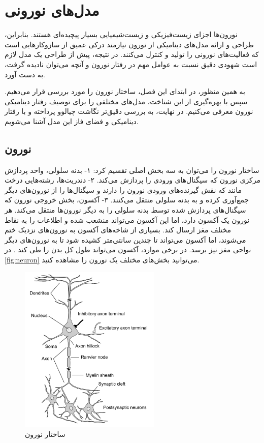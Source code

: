 \chapter{مدل‌های نورونی} \label{chap:neuron}

نورون‌ها اجزای زیست‌فیزیکی و زیست‌شیمیایی بسیار پیچیده‌ای هستند.
بنابراین، طراحی و ارائه مدل‌های دینامیکی از نورون نیازمند درکی عمیق از سازوکارهایی است که فعالیت‌های نورونی را تولید و کنترل می‌کنند.
در نتیجه، پیش از طراحی یک مدل لازم است شهودی دقیق نسبت به عوامل مهم در رفتار نورون و آنچه می‌توان نادیده گرفت، به دست آورد.

به همین منظور، در ابتدای این فصل، ساختار نورون را مورد بررسی قرار می‌دهیم.
سپس با بهره‌گیری از این شناخت، مدل‌های مختلفی را برای توصیف رفتار دینامیکی نورون معرفی می‌کنیم.
در نهایت، به بررسی دقیق‌تر نگاشت چیالوو پرداخته و با رفتار دینامیکی و فضای فاز این مدل آشنا می‌شویم.

\section{نورون}
ساختار نورون را می‌توان به سه بخش اصلی تقسیم کرد:
۱- بدنه سلولی، واحد پردازش مرکزی نورون که سیگنال‌های ورودی را پردازش می‌کند.
۲- دندریت‌ها، رشته‌هایی درخت مانند که نقش گیرنده‌های ورودی نورون را دارند و سیگنال‌ها را از نورون‌های دیگر جمع‌آوری کرده و به بدنه سلولی منتقل می‌کنند.
۳- آکسون، بخش خروجی نورون که سیگنال‌های پردازش شده توسط بدنه سلولی را به دیگر نورون‌ها منتقل می‌کند.
هر نورون یک آکسون دارد، اما این آکسون می‌تواند منشعب شده و اطلاعات را به نقاط مختلف مغز ارسال کند.
بسیاری از شاخه‌های آکسون به نورون‌های نزدیک ختم می‌شوند، اما آکسون می‌تواند تا چندین سانتی‌متر کشیده شود تا به نورون‌های دیگر نواحی مغز نیز برسد.
در برخی موارد، آکسون می‌تواند طول کل بدن را طی کند
\cite{dayan2001,gerstner2002,rabinovich2006,trappenberg2022}.
در
\autoref{fig:neuron}
می‌توانید بخش‌های مختلف یک نورون را مشاهده کنید.

\begin{figure}[!ht]
    \centering
    \includegraphics[width=0.6\textwidth]{figures/neuron}
    \caption[ساختار نورون]{ساختار نورون \cite{trappenberg2022}}
    \label{fig:neuron}
\end{figure}

